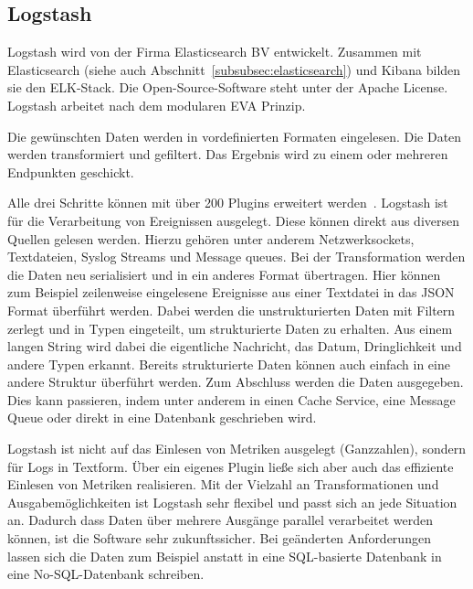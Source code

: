 \subsection{Logstash}
\label{subsec:logstash}
Logstash wird von der Firma Elasticsearch BV entwickelt. Zusammen mit
Elasticsearch (siehe auch Abschnitt~\ref{subsubsec:elasticsearch}) und
\gls{Kibana} bilden sie den ELK-Stack. Die Open-Source-Software steht unter der
Apache License. Logstash arbeitet nach dem modularen \gls{EVA} Prinzip.

\begin{outline}
  \1 Die gewünschten Daten werden in vordefinierten Formaten eingelesen.
  \1 Die Daten werden transformiert und gefiltert.
  \1 Das Ergebnis wird zu einem oder mehreren Endpunkten geschickt.
\end{outline}

Alle drei Schritte können mit über 200 Plugins erweitert
werden~\cite{logstash_overview}. Logstash ist für die Verarbeitung von
Ereignissen ausgelegt. Diese können direkt aus diversen Quellen gelesen werden.
Hierzu gehören unter anderem Netzwerksockets, Textdateien, Syslog Streams und
Message queues. Bei der Transformation werden die Daten neu serialisiert und in
ein anderes Format übertragen. Hier können zum Beispiel zeilenweise eingelesene
Ereignisse aus einer Textdatei in das \gls{JSON} Format überführt werden. Dabei
werden die unstrukturierten Daten mit Filtern zerlegt und in Typen eingeteilt,
um strukturierte Daten zu erhalten. Aus einem langen String wird dabei die
eigentliche Nachricht, das Datum, Dringlichkeit und andere Typen erkannt.
Bereits strukturierte Daten können auch einfach in eine andere Struktur
überführt werden. Zum Abschluss werden die Daten ausgegeben. Dies kann
passieren, indem unter anderem in einen Cache Service, eine Message Queue oder
direkt in eine Datenbank geschrieben wird.

Logstash ist nicht auf das Einlesen von Metriken ausgelegt (Ganzzahlen),
sondern für Logs in Textform. Über ein eigenes Plugin ließe sich aber auch das
effiziente Einlesen von Metriken realisieren. Mit der Vielzahl an
Transformationen und Ausgabemöglichkeiten ist Logstash sehr flexibel und passt
sich an jede Situation an. Dadurch dass Daten über mehrere Ausgänge parallel
verarbeitet werden können, ist die Software sehr zukunftssicher. Bei geänderten
Anforderungen lassen sich die Daten zum Beispiel anstatt in eine SQL-basierte
Datenbank in eine No-SQL-Datenbank schreiben.
\tm%

